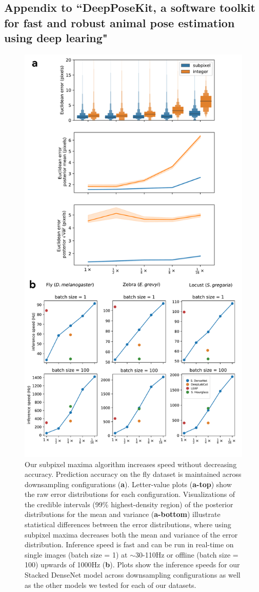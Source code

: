 \documentclass[11pt,a4paper,twoside]{book}
\begin{document}
\begin{doublespace}
\newpage

\begin{appendices}
\chapter[DeepPoseKit]{Appendix to ``DeepPoseKit, a software toolkit for fast and robust animal pose estimation using deep learing"}

    \label{app:figures}
    \begin{figure}[!htb]
    
    \centering
    \includegraphics[width=0.60\linewidth]{Graving_IMPRS_Thesis/figures/downsample_inference_speed.pdf}
    \caption{Our subpixel maxima algorithm increases speed without decreasing accuracy. Prediction accuracy on the fly dataset is maintained across downsampling configurations (\textbf{a}). Letter-value plots (\textbf{a-top}) show the raw error distributions for each configuration. Visualizations of the credible intervals (99\% highest-density region) of the posterior distributions for the mean and variance (\textbf{a-bottom}) illustrate statistical differences between the error distributions, where using subpixel maxima decreases both the mean and variance of the error distribution. Inference speed is fast and can be run in real-time on single images (batch size = 1) at $\sim$30-110Hz or offline (batch size = 100) upwards of 1000Hz (\textbf{b}). Plots show the inference speeds for our Stacked DenseNet model across downsampling configurations as well as the other models we tested for each of our datasets. }
    \label{fig:downsample_inference_speed}
    

\end{figure}
\end{appendices}
\end{doublespace}
\end{document}
